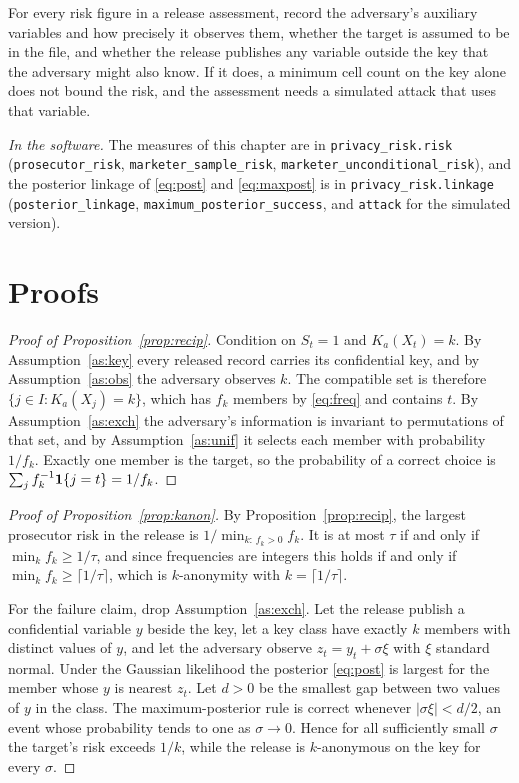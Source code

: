 \begin{inpractice}
For every risk figure in a release assessment, record the adversary's auxiliary
variables and how precisely it observes them, whether the target is assumed to be
in the file, and whether the release publishes any variable outside the key that the
adversary might also know. If it does, a minimum cell count on the key alone does
not bound the risk, and the assessment needs a simulated attack that uses that
variable.

\smallskip\noindent\textit{In the software.} The measures of this chapter are in
\texttt{privacy\_risk.risk} (\texttt{prosecutor\_risk},
\texttt{marketer\_sample\_risk}, \texttt{marketer\_unconditional\_risk}), and the
posterior linkage of \eqref{eq:post} and \eqref{eq:maxpost} is in
\texttt{privacy\_risk.linkage} (\texttt{posterior\_linkage},
\texttt{maximum\_posterior\_success}, and \texttt{attack} for the simulated
version).
\end{inpractice}

\section{Proofs}

\begin{proof}[Proof of Proposition~\ref{prop:recip}]
Condition on $S_t = 1$ and $K_a(X_t) = k$. By Assumption~\ref{as:key} every
released record carries its confidential key, and by Assumption~\ref{as:obs} the
adversary observes $k$. The compatible set is therefore
$\{j \in I : K_a(X_j) = k\}$, which has $f_k$ members by \eqref{eq:freq} and
contains $t$. By Assumption~\ref{as:exch} the adversary's information is invariant
to permutations of that set, and by Assumption~\ref{as:unif} it selects each member
with probability $1/f_k$. Exactly one member is the target, so the probability of
a correct choice is $\sum_{j} f_k^{-1}\mathbf{1}\{j = t\} = 1/f_k$.
\end{proof}

\begin{proof}[Proof of Proposition~\ref{prop:kanon}]
By Proposition~\ref{prop:recip}, the largest prosecutor risk in the release is
$1/\min_{k:\,f_k>0} f_k$. It is at most $\tau$ if and only if
$\min_k f_k \ge 1/\tau$, and since frequencies are integers this holds if and only
if $\min_k f_k \ge \lceil 1/\tau \rceil$, which is $k$-anonymity with
$k = \lceil 1/\tau \rceil$.

For the failure claim, drop Assumption~\ref{as:exch}. Let the release publish a
confidential variable $y$ beside the key, let a key class have exactly $k$ members
with distinct values of $y$, and let the adversary observe
$z_t = y_t + \sigma\xi$ with $\xi$ standard normal. Under the Gaussian likelihood
the posterior \eqref{eq:post} is largest for the member whose $y$ is nearest $z_t$.
Let $d > 0$ be the smallest gap between two values of $y$ in the class. The
maximum-posterior rule is correct whenever $|\sigma\xi| < d/2$, an event whose
probability tends to one as $\sigma \to 0$. Hence for all sufficiently small
$\sigma$ the target's risk exceeds $1/k$, while the release is $k$-anonymous on the
key for every $\sigma$.
\end{proof}

